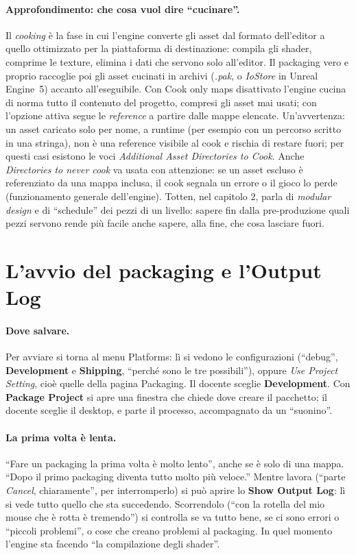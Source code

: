\paragraph{Approfondimento: che cosa vuol dire ``cucinare''.} Il \emph{cooking} è la fase in
cui l'engine converte gli asset dal formato dell'editor a quello ottimizzato per la
piattaforma di destinazione: compila gli shader, comprime le texture, elimina i dati che
servono solo all'editor. Il packaging vero e proprio raccoglie poi gli asset cucinati in
archivi (\emph{.pak}, o \emph{IoStore} in Unreal Engine~5) accanto all'eseguibile. Con Cook
only maps disattivato l'engine cucina di norma tutto il contenuto del progetto, compresi gli
asset mai usati; con l'opzione attiva segue le \emph{reference} a partire dalle mappe
elencate. Un'avvertenza: un asset caricato solo per nome, a runtime (per esempio con un
percorso scritto in una stringa), non è una reference visibile al cook e rischia di restare
fuori; per questi casi esistono le voci \emph{Additional Asset Directories to Cook}. Anche
\emph{Directories to never cook} va usata con attenzione: se un asset escluso è referenziato
da una mappa inclusa, il cook segnala un errore o il gioco lo perde (funzionamento generale
dell'engine). Totten, nel capitolo 2, parla di \emph{modular design} e di ``schedule'' dei
pezzi di un livello: sapere fin dalla pre-produzione quali pezzi servono rende più facile
anche sapere, alla fine, che cosa lasciare fuori.

\section{L'avvio del packaging e l'Output Log}
\label{ue16:sec:avvio}

\paragraph{Dove salvare.} Per avviare si torna al menu Platforms: lì si vedono le
configurazioni (``debug'', \textbf{Development} e \textbf{Shipping}, ``perché sono le tre
possibili''), oppure \emph{Use Project Setting}, cioè quelle della pagina Packaging. Il docente
sceglie \textbf{Development}. Con \textbf{Package Project} si apre una finestra che chiede dove
creare il pacchetto; il docente sceglie il desktop, e parte il processo, accompagnato da un
``suonino''.

\paragraph{La prima volta è lenta.} ``Fare un packaging la prima volta è molto lento'', anche
se è solo di una mappa. ``Dopo il primo packaging diventa tutto molto più veloce.'' Mentre
lavora (``parte \emph{Cancel}, chiaramente'', per interromperlo) si può aprire lo
\textbf{Show Output Log}: lì si vede tutto quello che sta succedendo. Scorrendolo (``con la
rotella del mio mouse che è rotta è tremendo'') si controlla se va tutto bene, se ci sono
errori o ``piccoli problemi'', o cose che creano problemi al packaging. In quel momento
l'engine sta facendo ``la compilazione degli shader''.

